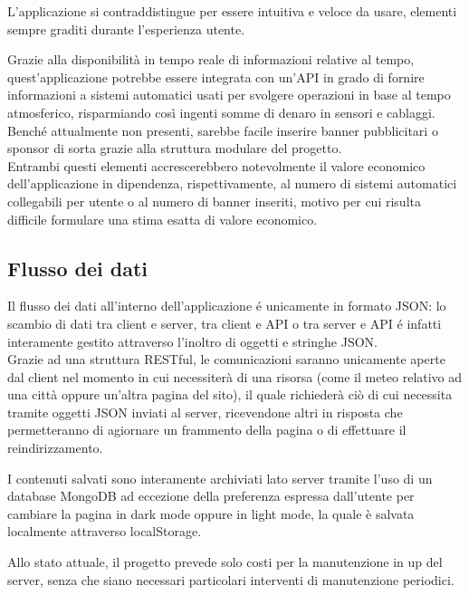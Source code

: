 L'applicazione si contraddistingue per essere intuitiva e veloce da usare, elementi sempre graditi durante l'esperienza utente.

\vspace{5mm}

Grazie alla disponibilità in tempo reale di informazioni relative al tempo, quest'applicazione potrebbe essere integrata con
un'API in grado di fornire informazioni a sistemi automatici usati per svolgere operazioni in base al tempo atmosferico,
risparmiando così ingenti somme di denaro in sensori e cablaggi.\\
Benché attualmente non presenti, sarebbe facile inserire banner pubblicitari o sponsor di sorta grazie alla struttura modulare
del progetto.\\
Entrambi questi elementi accrescerebbero notevolmente il valore economico dell'applicazione in dipendenza, rispettivamente, al
numero di sistemi automatici collegabili per utente o al numero di banner inseriti, motivo per cui risulta difficile formulare
una stima esatta di valore economico.

\subsection{Flusso dei dati}

Il flusso dei dati all'interno dell'applicazione é unicamente in formato JSON: lo scambio di dati tra client e server, tra
client e API o tra server e API é infatti interamente gestito attraverso l'inoltro di oggetti e stringhe JSON.\\
Grazie ad una struttura RESTful, le comunicazioni saranno unicamente aperte dal client nel momento in cui necessiterà di una risorsa
(come il meteo relativo ad una città oppure un'altra pagina del sito), il quale richiederà ciò di cui necessita tramite
oggetti JSON inviati al server, ricevendone altri in risposta che permetteranno di agiornare un frammento della pagina o di effettuare
il reindirizzamento.

\vspace{5mm}

I contenuti salvati sono interamente archiviati lato server tramite l'uso di un database MongoDB ad eccezione della preferenza
espressa dall'utente per cambiare la pagina in dark mode oppure in light mode, la quale è salvata localmente attraverso
localStorage.

\vspace{5mm}

Allo stato attuale, il progetto prevede solo costi per la manutenzione in up del server, senza che siano necessari particolari
interventi di manutenzione periodici.

